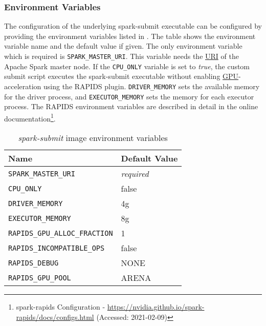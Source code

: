 \subsubsection{Environment Variables}
The configuration of the underlying spark-submit executable can be configured by providing the environment variables listed in . The table shows the environment variable name and the default value if given.
The only environment variable which is required is \texttt{SPARK\_MASTER\_URI}. This variable needs the \hyperlink{abbr:uri}{URI} of the Apache Spark master node.
If the \texttt{CPU\_ONLY} variable is set to \textit{true}, the custom submit script executes the spark-submit executable without enabling \hyperlink{abbr:gpiu}{GPU}-acceleration using the RAPIDS plugin.
\texttt{DRIVER\_MEMORY} sets the available memory for the driver process, and \texttt{EXECUTOR\_MEMORY} sets the memory for each executor process.
The RAPIDS environment variables are described in detail in the online documentation\footnote{spark-rapids Configuration - \url{https://nvidia.github.io/spark-rapids/docs/configs.html} (Accessed: 2021-02-09)}.
\begin{table}[]
\centering
\begin{tabular}{@{}ll@{}}
\toprule
Name                                                   & Default Value     \\ \midrule
\texttt{SPARK\_MASTER\_URI}           & \textit{required} \\
\texttt{CPU\_ONLY}           & false \\
\texttt{DRIVER\_MEMORY}               & 4g                \\
\texttt{EXECUTOR\_MEMORY}             & 8g                \\
\texttt{RAPIDS\_GPU\_ALLOC\_FRACTION} & 1                 \\
\texttt{RAPIDS\_INCOMPATIBLE\_OPS}    & false             \\
\texttt{RAPIDS\_DEBUG}                & NONE              \\
\texttt{RAPIDS\_GPU\_POOL}            & ARENA             \\ \bottomrule
\end{tabular}
\caption{\textit{spark-submit} image environment variables}
\label{table:06_env_depl_submit-envs}
\end{table}


